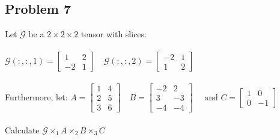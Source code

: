 \documentclass[12pt]{article}
\begin{document}
\newpage
\subsection*{Problem 7} Let $\mathcal{G}$ be a $2\times 2\times 2$ tensor with slices:
\\~\\$\mathcal{G}(:,:, 1)=\left[\begin{array}{cc}{1} & {2} \\ {-2} & {1}\end{array}\right] \quad \mathcal{G}(:,:, 2)=\left[\begin{array}{cc}{-2} & {1} \\ {1} & {2}\end{array}\right]$
\\~\\Furthermore, let: $A=\left[\begin{array}{ll}{1} & {4} \\ {2} & {5} \\ {3} & {6}\end{array}\right] \quad B=\left[\begin{array}{cc}{-2} & {2} \\ {3} & {-3} \\ {-4} & {-4}\end{array}\right] \quad \text { and } C=\left[\begin{array}{cc}{1} & {0} \\ {0} & {-1}\end{array}\right]$
\\~\\Calculate $\mathcal{G} \times_{1} A \times_{2} B \times_{3} C$
\end{document}
